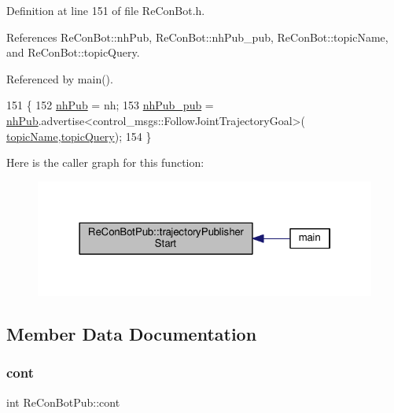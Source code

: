 Definition at line 151 of file Re\+Con\+Bot.\+h.



References Re\+Con\+Bot\+::nh\+Pub, Re\+Con\+Bot\+::nh\+Pub\+\_\+pub, Re\+Con\+Bot\+::topic\+Name, and Re\+Con\+Bot\+::topic\+Query.



Referenced by main().


\begin{DoxyCode}
151                                                                            \{
152   \hyperlink{class_re_con_bot_a37edfe9c2dbbf37894c9bf850806fdd3}{nhPub} = nh;
153   \hyperlink{class_re_con_bot_a549b7542d286b690f38b7ece8b83850b}{nhPub\_pub} = \hyperlink{class_re_con_bot_a37edfe9c2dbbf37894c9bf850806fdd3}{nhPub}.advertise<control\_msgs::FollowJointTrajectoryGoal>(
      \hyperlink{class_re_con_bot_a1d91d2ea8c0f16340440357906fb9ebf}{topicName},\hyperlink{class_re_con_bot_aba20d307ac1b2e6b22f96da83a0d937d}{topicQuery});
154 \}
\end{DoxyCode}
Here is the caller graph for this function\+:\nopagebreak
\begin{figure}[H]
\begin{center}
\leavevmode
\includegraphics[width=322pt]{d6/d1b/class_re_con_bot_pub_a2019b0d8d30f2419026c90dd30de500f_icgraph}
\end{center}
\end{figure}


\subsection{Member Data Documentation}
\mbox{\label{class_re_con_bot_pub_a2b0249f374eb7a6ab7741a85d8ebd9d5}} 
\subsubsection{\texorpdfstring{cont}{cont}}
{\footnotesize\ttfamily int Re\+Con\+Bot\+Pub\+::cont\hspace{0.3cm}{\ttfamily [protected]}}



